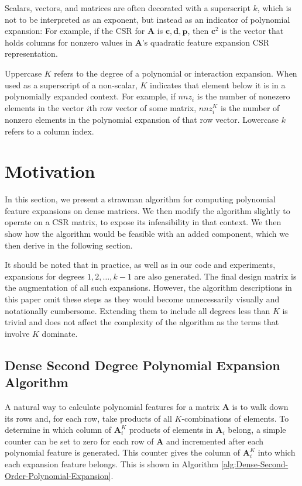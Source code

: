 \documentclass{article}
\begin{document}
Scalars, vectors, and matrices are often decorated with a superscript $k$, which is not to be interpreted as an exponent, but instead as an indicator of polynomial expansion: 
For example, if the CSR for $\bm{A}$ is $\bm{c}, \bm{d}, \bm{p}$, then $\bm{c}^2$ is the vector that holds columns for nonzero values in $\bm{A}$'s quadratic feature expansion CSR representation.

Uppercase $K$ refers to the degree of a polynomial or interaction expansion.
When used as a superscript of a non-scalar, $K$ indicates that element below it is in a polynomially expanded context.
For example, if $nnz_i$ is the number of nonezero elements in the vector $i$th row vector of some matrix, $nnz_i^K$ is the number of nonzero elements in the polynomial expansion of that row vector.
Lowercase $k$ refers to a column index.

\section{Motivation}
In this section, we present a strawman algorithm for computing polynomial feature expansions on dense matrices.
We then modify the algorithm  slightly to operate on a CSR matrix, to expose its infeasibility in that context.
We then show how the algorithm would be feasible with an added component, which we then derive in the following section.

It should be noted that in practice, as well as in our code and experiments, expansions for degrees $1, 2, \dots, k-1$ are also generated.
The final design matrix is the augmentation of all such expansions.
However, the algorithm descriptions in this paper omit these steps as they would become unnecessarily visually and notationally cumbersome.
Extending them to include all degrees less than $K$ is trivial and does not affect the complexity of the algorithm as the terms that involve $K$ dominate.

\subsection{Dense Second Degree Polynomial Expansion Algorithm}
A natural way to calculate polynomial features for a matrix $\bm{A}$ is to walk down its rows and, for each row, take products of all $K$-combinations of elements.
To determine in which column of $\bm{A}^K_i$ products of elements in $\bm{A}_i$ belong, a simple counter can be set to zero for each row of $\bm{A}$ and incremented after each polynomial feature is generated.
This counter gives the column of $\bm{A}^K_i$ into which each expansion feature belongs.
This is shown in Algorithm \ref{alg:Dense-Second-Order-Polynomial-Expansion}.
\end{document}

